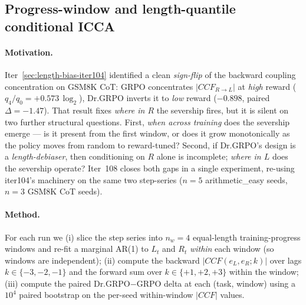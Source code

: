 
\subsection{Progress-window and length-quantile conditional ICCA}
\label{sec:length-bias-iter108}

\paragraph{Motivation.}
Iter~\ref{sec:length-bias-iter104} identified a clean \emph{sign-flip} of the
backward coupling concentration on GSM8K CoT: GRPO concentrates
$|CCF_{R\to L}|$ at \emph{high} reward ($q_4/q_0 = +0.573\,\log_2$),
Dr.GRPO inverts it to \emph{low} reward ($-0.898$, paired
$\Delta=-1.47$).  That result fixes \emph{where in $R$} the severship
fires, but it is silent on two further structural questions.  First,
\emph{when across training} does the severship emerge --- is it present
from the first window, or does it grow monotonically as the policy
moves from random to reward-tuned?  Second, if Dr.GRPO's design is a
\emph{length-debiaser}, then conditioning on $R$ alone is incomplete;
\emph{where in $L$} does the severship operate?  Iter~108 closes both
gaps in a single experiment, re-using iter104's machinery on the same
two step-series ($n=5$ arithmetic\_easy seeds, $n=3$ GSM8K CoT seeds).

\paragraph{Method.}
For each run we (i) slice the step series into $n_w=4$ equal-length
training-progress windows and re-fit a marginal AR(1) to $L_t$ and $R_t$
\emph{within} each window (so windows are independent); (ii) compute the
backward $|CCF(e_L,e_R;k)|$ over lags $k\in\{-3,-2,-1\}$ and the forward
sum over $k\in\{+1,+2,+3\}$ within the window; (iii) compute the paired
Dr.GRPO$-$GRPO delta at each (task, window) using a $10^4$ paired
bootstrap on the per-seed within-window $|CCF|$ values.

